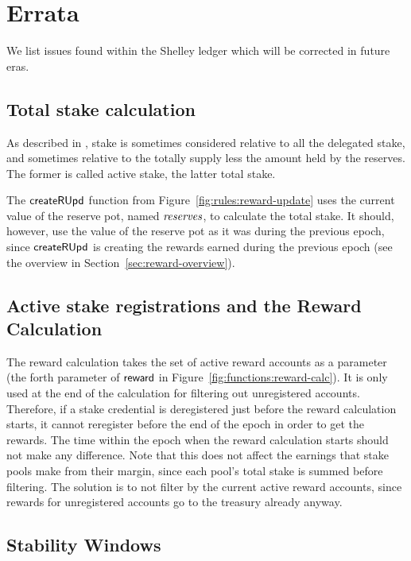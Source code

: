 \section{Errata}
\label{sec:errata}

We list issues found within the Shelley ledger which will be corrected in future eras.

\subsection{Total stake calculation}
\label{sec:errata:total-stake}

As described in \cite[3.4.3]{delegation_design}, stake is sometimes considered
relative to all the delegated stake, and sometimes relative to the
totally supply less the amount held by the reserves.
The former is called active stake, the latter total stake.


The $\mathsf{createRUpd}$ function from Figure~\ref{fig:rules:reward-update} uses the
current value of the reserve pot, named $\mathit{reserves}$, to calculate the total stake.
It should, however, use the value of the reserve pot as it was during the previous
epoch, since $\mathsf{createRUpd}$ is creating the rewards earned during the previous epoch
(see the overview in Section~\ref{sec:reward-overview}).

\subsection{Active stake registrations and the Reward Calculation}
\label{sec:errata:active-accounts-and-reward-calc}

The reward calculation takes the set of active reward accounts as a parameter
(the forth parameter of $\mathsf{reward}$ in Figure~\ref{fig:functions:reward-calc}).
It is only used at the end of the calculation for filtering out unregistered accounts.
Therefore, if a stake credential is deregistered just before the reward calculation starts,
it cannot reregister before the end of the epoch in order to get the rewards.
The time within the epoch when the reward calculation starts should not make any difference.
Note that this does not affect the earnings that stake pools make from their margin,
since each pool's total stake is summed before filtering.
The solution is to not filter by the current active reward accounts, since rewards for
unregistered accounts go to the treasury already anyway.

\subsection{Stability Windows}
\label{sec:errata:stability-windows}

